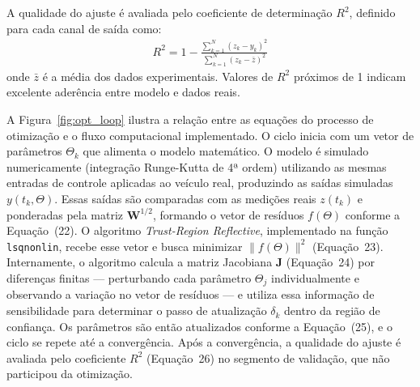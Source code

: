 \documentclass[letterpaper, 10 pt, conference]{ieeeconf}
\begin{document}
A qualidade do ajuste é avaliada pelo coeficiente de determinação $R^2$, definido para cada canal de saída como:
\begin{align}
R^2 = 1 - \frac{\sum_{k=1}^{N}(z_k - y_k)^2}{\sum_{k=1}^{N}(z_k - \bar{z})^2}
\end{align}
onde $\bar{z}$ é a média dos dados experimentais. Valores de $R^2$ próximos de 1 indicam excelente aderência entre modelo e dados reais.

A Figura~\ref{fig:opt_loop} ilustra a relação entre as equações do processo de otimização e o fluxo computacional implementado. O ciclo inicia com um vetor de parâmetros $\Theta_k$ que alimenta o modelo matemático. O modelo é simulado numericamente (integração Runge-Kutta de 4ª ordem) utilizando as mesmas entradas de controle aplicadas ao veículo real, produzindo as saídas simuladas $y(t_k, \Theta)$. Essas saídas são comparadas com as medições reais $z(t_k)$ e ponderadas pela matriz $\mathbf{W}^{1/2}$, formando o vetor de resíduos $f(\Theta)$ conforme a Equação~(22). O algoritmo \textit{Trust-Region Reflective}, implementado na função \texttt{lsqnonlin}, recebe esse vetor e busca minimizar $\|f(\Theta)\|^2$ (Equação~23). Internamente, o algoritmo calcula a matriz Jacobiana $\mathbf{J}$ (Equação~24) por diferenças finitas --- perturbando cada parâmetro $\Theta_j$ individualmente e observando a variação no vetor de resíduos --- e utiliza essa informação de sensibilidade para determinar o passo de atualização $\delta_k$ dentro da região de confiança. Os parâmetros são então atualizados conforme a Equação~(25), e o ciclo se repete até a convergência. Após a convergência, a qualidade do ajuste é avaliada pelo coeficiente $R^2$ (Equação~26) no segmento de validação, que não participou da otimização.
\end{document}

